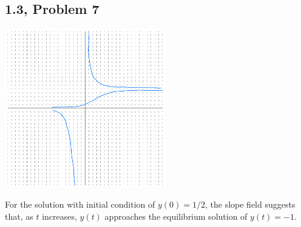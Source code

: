 \documentclass[12pt]{mypackage}
\begin{document}
\subsection{1.3, Problem 7}%
\begin{center}
  \includegraphics[width=7cm]{images/1_3_7.png}
\end{center}
For the solution with initial condition of $y(0) = 1/2$, the slope field suggests that, as $t$ increases, $y(t)$ approaches the equilibrium solution of $y(t) = -1$.
\end{document}
